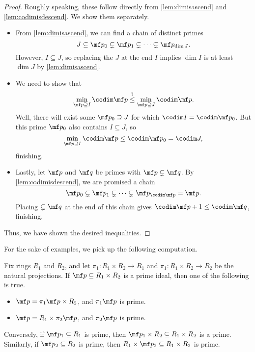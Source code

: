 \begin{proof}
	Roughly speaking, these follow directly from \autoref{lem:dimisascend} and \autoref{lem:codimisdescend}. We show them separately.
	\begin{itemize}
		\item From \autoref{lem:dimisascend}, we can find a chain of distinct primes
		\[J\subseteq\mf p_0\subsetneq\mf p_1\subsetneq\cdots\subsetneq\mf p_{\dim J}.\]
		However, $I\subseteq J$, so replacing the $J$ at the end $I$ implies $\dim I$ is at least $\dim J$ by \autoref{lem:dimisascend}.
		\item We need to show that
		\[\min_{\mf p\supseteq I}\codim\mf p\stackrel?\le\min_{\mf p\supseteq J}\codim\mf p.\]
		Well, there will exist some $\mf p_0\supseteq J$ for which $\codim I=\codim\mf p_0$. But this prime $\mf p_0$ also contains $I\subseteq J$, so
		\[\min_{\mf p\supseteq I}\codim\mf p\le\codim\mf p_0=\codim J,\]
		finishing.
		\item Lastly, let $\mf p$ and $\mf q$ be primes with $\mf p\subsetneq\mf q$. By \autoref{lem:codimisdescend}, we are promised a chain
		\[\mf p_0\subsetneq\mf p_1\subsetneq\cdots\subsetneq\mf p_{\codim\mf p}=\mf p.\]
		Placing $\subsetneq\mf q$ at the end of this chain gives $\codim\mf p+1\le\codim\mf q$, finishing.
	\end{itemize}
	Thus, we have shown the desired inequalities.
\end{proof}
For the sake of examples, we pick up the following computation.
\begin{lemma} \label{lem:primesinprods}
	Fix rings $R_1$ and $R_2$, and let $\pi_1:R_1\times R_2\to R_1$ and $\pi_1:R_1\times R_2\to R_2$ be the natural projections. If $\mf p\subseteq R_1\times R_2$ is a prime ideal, then one of the following is true.
	\begin{itemize}
		\item $\mf p=\pi_1\mf p\times R_2$, and $\pi_1\mf p$ is prime.
		\item $\mf p=R_1\times\pi_2\mf p$, and $\pi_2\mf p$ is prime.
	\end{itemize}
	Conversely, if $\mf p_1\subseteq R_1$ is prime, then $\mf p_1\times R_2\subseteq R_1\times R_2$ is a prime. Similarly, if $\mf p_2\subseteq R_2$ is prime, then $R_1\times\mf p_2\subseteq R_1\times R_2$ is prime.
\end{lemma}
